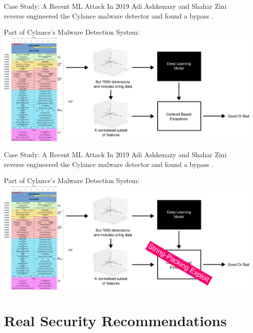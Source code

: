 \documentclass{beamer}
\begin{document}
\begin{frame}{Case Study: A Recent ML Attack}
    In 2019 Adi Ashkenazy and Shahar Zini reverse engineered the Cylance malware detector and found a bypass \cite{cylance_i_kill_you}.
    \vspace{10pt}
    \begin{center}
        Part of Cylance's Malware Detection System:
        \includegraphics[scale=0.15]{cylance_diagram2.png}
    \end{center}
\end{frame}

\begin{frame}{Case Study: A Recent ML Attack}
    In 2019 Adi Ashkenazy and Shahar Zini reverse engineered the Cylance malware detector and found a bypass \cite{cylance_i_kill_you}.
    \vspace{10pt}
    \begin{center}
        Part of Cylance's Malware Detection System:
        \includegraphics[scale=0.15]{cylance_diagram3.png}
    \end{center}
\end{frame}

\section{Real Security Recommendations}
\end{document}

